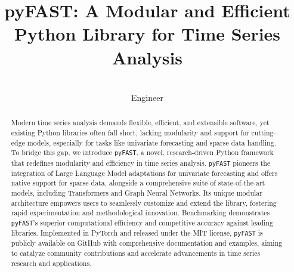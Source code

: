 \documentclass{article}
\title{pyFAST: A Modular and Efficient Python Library for Time Series Analysis}
\author{\Name{Cline} \Email{cline@example.com} \\
       \addrSoftware Engineer}
\begin{document}
\maketitle

\begin{abstract}
Modern time series analysis demands flexible, efficient, and extensible software, yet existing Python libraries often fall short, lacking modularity and support for cutting-edge models, especially for tasks like univariate forecasting and sparse data handling. To bridge this gap, we introduce \texttt{pyFAST}, a novel, research-driven Python framework that redefines modularity and efficiency in time series analysis.  \texttt{pyFAST} pioneers the integration of Large Language Model adaptations for univariate forecasting and offers native support for sparse data, alongside a comprehensive suite of state-of-the-art models, including Transformers and Graph Neural Networks.  Its unique modular architecture empowers users to seamlessly customize and extend the library, fostering rapid experimentation and methodological innovation. Benchmarking demonstrates \texttt{pyFAST}'s superior computational efficiency and competitive accuracy against leading libraries. Implemented in PyTorch and released under the MIT license, \texttt{pyFAST} is publicly available on GitHub with comprehensive documentation and examples, aiming to catalyze community contributions and accelerate advancements in time series research and applications.
\end{abstract}
\end{document}
